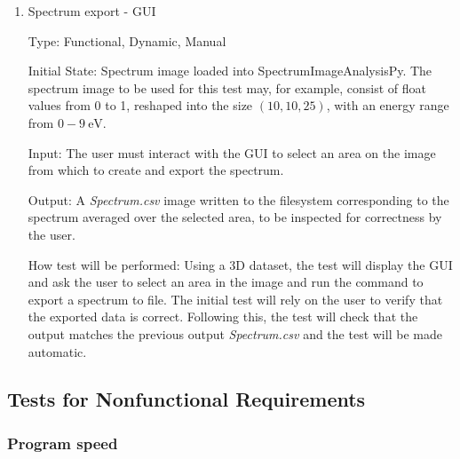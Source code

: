 \documentclass[12pt, titlepage]{article}
\newcommand{\progname}{SpectrumImageAnalysisPy}
\begin{document}
\begin{enumerate}
\item{Spectrum export - GUI}
\label{TFR:SpecExportGUI}

Type: Functional, Dynamic, Manual

Initial State: Spectrum image loaded into \progname{}. The spectrum image to be
used for this test may, for example, consist of float values from 0 to 1,
reshaped into the size $(10,10,25)$, with an energy range from $0-9\
\si{\electronvolt}$.

Input: The user must interact with the GUI to select an area on the image from
which to create and export the spectrum.

Output: A \textit{Spectrum.csv} image written to the filesystem corresponding to
the spectrum averaged over the selected area, to be inspected for correctness by
the user.

How test will be performed: Using a 3D dataset, the test will display the GUI
and ask the user to select an area in the image and run the command to export a
spectrum to file. The initial test will rely on the user to verify that the exported
data is correct. Following this, the test will check that the output matches the
previous output \textit{Spectrum.csv} and the test will be made automatic.\\

\end{enumerate}


\subsection{Tests for Nonfunctional Requirements}
\label{subsec:NonfuncReqTest}

\subsubsection{Program speed}
\end{document}
